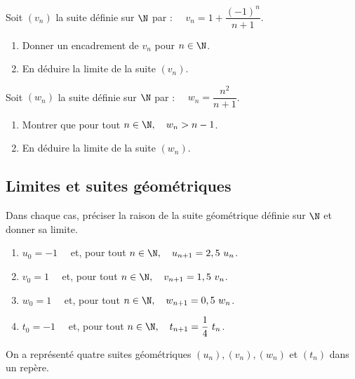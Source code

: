 \documentclass[a4paper,11pt,exos]{nsi} %
\begin{document}
\exo{}
Soit $(v_n)$ la suite définie sur $\N$ par : $\quad v_n=1+\dfrac{(-1)^n}{n+1}$.
\begin{enumerate}
    \item Donner un encadrement de $v_n$ pour $n\in\N$.
    \item En déduire la limite de la suite $(v_n)$.
\end{enumerate}


\exo{}
Soit $(w_n)$ la suite définie sur $\N$ par : $\quad w_n=\dfrac{n^2}{n+1}$.
\begin{enumerate}
    \item Montrer que pour tout $n\in\N, \quad w_n>n-1$.
    \item En déduire la limite de la suite $(w_n)$.
\end{enumerate}

\subsection*{Limites et suites géométriques}

\exo{}
Dans chaque cas, préciser la raison de la suite géométrique définie sur $\N$ et donner sa limite.
\begin{enumerate}
    \item $u_0=-1\quad$ et, pour tout $n\in\N, \quad u_{n+1}=2,5\ u_n$.
    \item $v_0=1\quad$ et, pour tout $n\in\N, \quad v_{n+1}=1,5\ v_n$.
    \item $w_0=1\quad$ et, pour tout $n\in\N, \quad w_{n+1}=0,5\ w_n$.
    \item $t_0=-1\quad$ et, pour tout $n\in\N, \quad t_{n+1}=\dfrac{1}{4}\ t_n$.
\end{enumerate}

\exo{}
On a représenté quatre suites géométriques $(u_n), (v_n), (w_n)$ et $(t_n)$ dans un repère.\\
\end{document}
